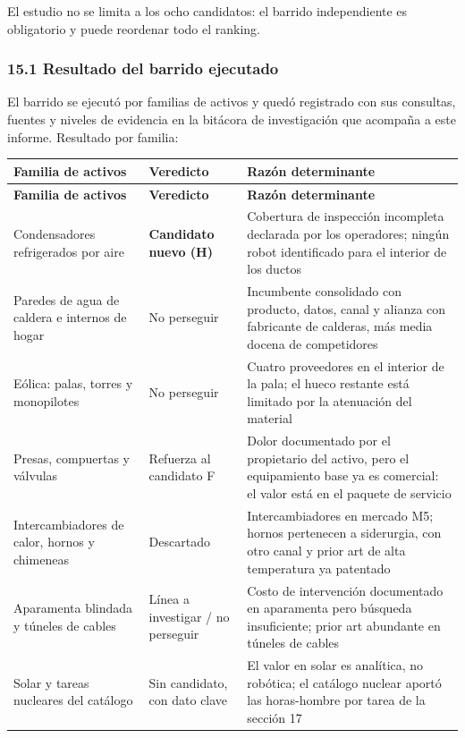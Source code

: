 \documentclass[11pt,a4paper]{article}
\begin{document}
El estudio no se limita a los ocho candidatos: el barrido independiente es obligatorio y puede reordenar todo el ranking.


\subsubsection*{15.1 Resultado del barrido ejecutado}

El barrido se ejecutó por familias de activos y quedó registrado con sus consultas, fuentes y niveles de evidencia en la bitácora de investigación que acompaña a este informe. Resultado por familia:

\begingroup\footnotesize
\setlength{\tabcolsep}{4pt}
\setlength{\emergencystretch}{4em}
 
\begin{longtable}{@{}>{\RaggedRight\arraybackslash}p{}>{\RaggedRight\arraybackslash}p{}>{\RaggedRight\arraybackslash}p{}@{}}
\toprule
\scriptsize\textbf{Familia de activos} & \scriptsize\textbf{Veredicto} & \scriptsize\textbf{Razón determinante} \\
\midrule
\endfirsthead
\toprule
\scriptsize\textbf{Familia de activos} & \scriptsize\textbf{Veredicto} & \scriptsize\textbf{Razón determinante} \\
\midrule
\endhead
\bottomrule
\endfoot
Condensadores refrigerados por aire & \textbf{Candidato nuevo (H)} & Cobertura de inspección incompleta declarada por los operadores; ningún robot identificado para el interior de los ductos \\
Paredes de agua de caldera e internos de hogar & No perseguir & Incumbente consolidado con producto, datos, canal y alianza con fabricante de calderas, más media docena de competidores \\
Eólica: palas, torres y monopilotes & No perseguir & Cuatro proveedores en el interior de la pala; el hueco restante está limitado por la atenuación del material \\
Presas, compuertas y válvulas & Refuerza al candidato F & Dolor documentado por el propietario del activo, pero el equipamiento base ya es comercial: el valor está en el paquete de servicio \\
Intercambiadores de calor, hornos y chimeneas & Descartado & Intercambiadores en mercado M5; hornos pertenecen a siderurgia, con otro canal y prior art de alta temperatura ya patentado \\
Aparamenta blindada y túneles de cables & Línea a investigar / no perseguir & Costo de intervención documentado en aparamenta pero búsqueda insuficiente; prior art abundante en túneles de cables \\
Solar y tareas nucleares del catálogo & Sin candidato, con dato clave & El valor en solar es analítica, no robótica; el catálogo nuclear aportó las horas-hombre por tarea de la sección 17 \\
\end{longtable}
\endgroup
\end{document}
